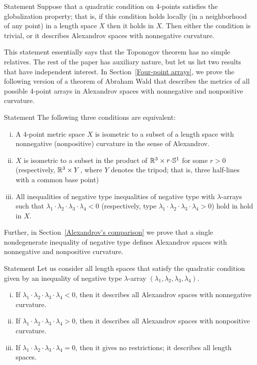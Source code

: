 \documentclass[a4paper,10pt]{article}
\begin{document}
\begin{thmA}{Statement}
Suppose that a quadratic condition on 4-points satisfies the globalization property;
that is, if this condition holds locally (in a neighborhood of any point) in a length space $X$ then it holds in $X$.
Then either the condition is trivial, or it describes Alexandrov spaces with nonnegative curvature.
\end{thmA}

This statement essentially says that the Toponogov theorem has no simple relatives.
The rest of the paper has auxiliary nature, but let us list two results that have independent interest.
In Section~\ref{Four-point arrays}, we prove the following version of a theorem of Abraham Wald \cite[§ 7]{wald} that describes the metrics of all possible 4-point arrays in Alexandrov spaces with nonnegative and nonpositive curvature.

\begin{thmA}{Statement}
The following three conditions are equivalent:
\begin{enumerate}[(i)]
\item A 4-point metric space $X$ is isometric to a subset of a length space with nonnegative (nonpositive) curvature in the sense of Alexandrov.
\item $X$ is isometric to a subset in the product of $\RR^3\times r\cdot \SSS^1$ for some $r>0$ (respectively, $\mathbb{R}^3\times Y$, where $Y$ denotes the tripod; that is, three half-lines with a common base point)
\item All inequalities of negative type inequalities of negative type with $\lambda$-arrays such that $\lambda_1\cdot\lambda_2\cdot\lambda_3\cdot\lambda_4<0$ (respectively, type $\lambda_1\cdot\lambda_2\cdot\lambda_3\cdot\lambda_4>0$) hold in hold in $X$.
\end{enumerate}
\end{thmA}

Further, in Section~\ref{Alexandrov's comparison} we prove that a single nondegenerate inequality of negative type defines Alexandrov spaces with nonnegative and nonpositive curvature.

\begin{thmA}{Statement}
Let us consider all length spaces that satisfy the quadratic condition given by an inequality of negative type $\lambda$-array $(\lambda_1,\lambda_2,\lambda_3,\lambda_4)$.
\begin{enumerate}[(i)]
\item If $\lambda_1\cdot\lambda_2\cdot\lambda_3\cdot\lambda_4<0$, then it describes all Alexandrov spaces with nonnegative curvature.
\item If $\lambda_1\cdot\lambda_2\cdot\lambda_3\cdot\lambda_4>0$, then it describes all Alexandrov spaces with nonpositive curvature.
\item If $\lambda_1\cdot\lambda_2\cdot\lambda_3\cdot\lambda_4=0$, then it gives no restrictions; it describes all length spaces.
\end{enumerate}

\end{thmA}
\end{document}
